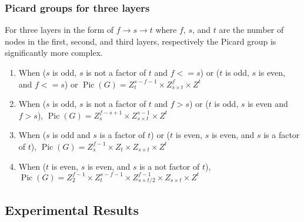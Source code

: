 \documentclass[11pt,reqno]{amsart}
\DeclareMathOperator{\Pic}{Pic}
\theoremstyle{definition}
\theoremstyle{plain}
\begin{document}
\subsubsection{Picard groups for three layers}
For three layers in the form of $f \rightarrow s \rightarrow t$ where $f$, $s$, and $t$ are the number of nodes
in the first, second, and third layers, respectively the Picard group is significantly more complex.

\begin{enumerate}
	\item When ($s$ is odd, $s$ is not a factor of $t$ and $f <= s$) or
	($t$ is odd, $s$ is even, and $f <= s$) or
	$\Pic(G) = Z_{t}^{s-f-1} \times Z_{s \times t}^{f} \times Z^t$
	
	\item When ($s$ is odd, $s$ is not a factor of $t$ and $f > s$) or
	($t$ is odd, $s$ is even and $f > s$),
	$\Pic(G) = Z_{s}^{f-s+1} \times Z_{s \times t}^{s-1} \times Z^t$
	
	\item When ($s$ is odd and $s$ is a factor of $t$) or ($t$ is even, $s$ is even, and $s$ is a factor of $t$),
	$\Pic(G) = Z_{s}^{f-1} \times Z_{t} \times Z_{s \times t} \times Z^t$
	
	\item When ($t$ is even, $s$ is even, and $s$ is a not factor of $t$),
	$\Pic(G) = Z_{2}^{f-1} \times Z_{t}^{s-f-1} \times Z_{s \times t/2}^{f-1} \times Z_{s \times t} \times Z^t$
\end{enumerate}


\subsection{Experimental Results}



\end{document}
